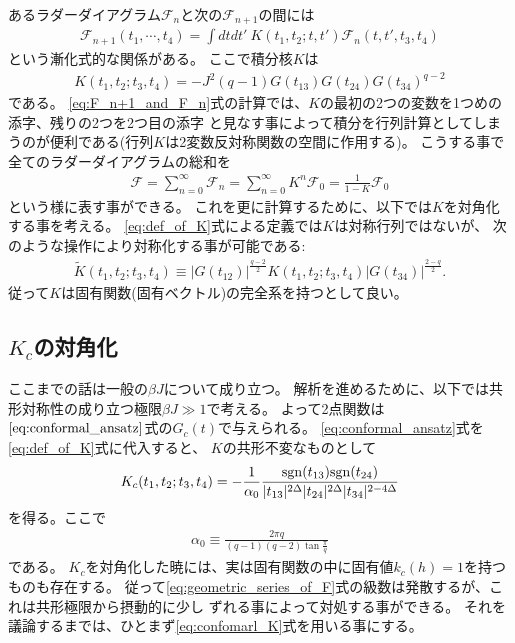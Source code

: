 あるラダーダイアグラム$\mathcal{F}_n$と次の$\mathcal{F}_{n+1}$の間には
\begin{align}
	\mathcal{F}_{n+1}(t_1, \cdots, t_4)
	= \int dtdt'\ K(t_1, t_2; t, t')\mathcal{F}_n(t, t', t_3, t_4)
	\label{eq:F_n+1_and_F_n}
\end{align}
という漸化式的な関係がある。
ここで積分核$K$は
\begin{align}
	K(t_1, t_2; t_3, t_4) = -J^2(q-1)G(t_{13})G(t_{24})G(t_{34})^{q-2}
	\label{eq:def_of_K}
\end{align}
である。
\eqref{eq:F_n+1_and_F_n}式の計算では、$K$の最初の2つの変数を1つめの添字、残りの2つを2つ目の添字
と見なす事によって積分を行列計算としてしまうのが便利である(行列$K$は2変数反対称関数の空間に作用する)。
こうする事で全てのラダーダイアグラムの総和を
\begin{align}
	\mathcal{F}
	= \sum_{n=0}^{\infty}\mathcal{F}_n
	= \sum_{n=0}^{\infty}K^n \mathcal{F}_0
	= \frac{1}{1 - K}\mathcal{F}_0
	\label{eq:geometric_series_of_F}
\end{align}
という様に表す事ができる。
これを更に計算するために、以下では$K$を対角化する事を考える。
\eqref{eq:def_of_K}式による定義では$K$は対称行列ではないが、
次のような操作により対称化する事が可能である:
\begin{align}
	\tilde{K}(t_1, t_2; t_3, t_4) \equiv
	|G(t_{12})|^{\frac{q-2}{2}}K(t_1, t_2; t_3, t_4)|G(t_{34})|^{\frac{2-q}{2}}.
	\label{eq:symmetric_K}
\end{align}
従って$K$は固有関数(固有ベクトル)の完全系を持つとして良い。

\subsection{$K_c$の対角化}
ここまでの話は一般の$\beta J$について成り立つ。
解析を進めるために、以下では共形対称性の成り立つ極限$\beta J \gg 1$で考える。
よって2点関数は$\eqref{eq:conformal_ansatz}$式の$G_c(t)$で与えられる。
\eqref{eq:conformal_ansatz}式を\eqref{eq:def_of_K}式に代入すると、
$K$の共形不変なものとして
\begin{align}
	K_c(t_1, t_2; t_3, t_4)
	= -\frac{1}{\alpha_0}
		\frac{\mathrm{sgn}(t_{13})\mathrm{sgn}(t_{24})}{|t_{13}|^{2\Delta}|t_{24}|^{2\Delta}|t_{34}|^{2-4\Delta}}
	\label{eq:confomarl_K}
\end{align}
を得る。ここで
\begin{align}
	\alpha_0 \equiv \frac{2\pi q}{(q-1)(q-2)\tan\frac{\pi}{q}}
	\label{eq:alpha_0}
\end{align}
である。
$K_c$を対角化した暁には、実は固有関数の中に固有値$k_c(h) = 1$を持つものも存在する。
従って\eqref{eq:geometric_series_of_F}式の級数は発散するが、これは共形極限から摂動的に少し
ずれる事によって対処する事ができる。
それを議論するまでは、ひとまず\eqref{eq:confomarl_K}式を用いる事にする。

